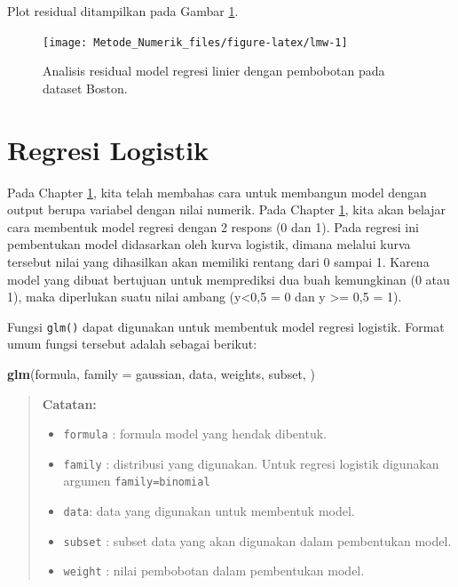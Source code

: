 \documentclass[
]{book}
\newenvironment{Shaded}{\begin{snugshade}}{\end{snugshade}}
\newcommand{\AttributeTok}[1]{\textcolor[rgb]{0.13,0.29,0.53}{#1}}
\newcommand{\FunctionTok}[1]{\textcolor[rgb]{0.13,0.29,0.53}{\textbf{#1}}}
\newcommand{\NormalTok}[1]{#1}
\providecommand{\tightlist}{%
  \setlength{\itemsep}{0pt}\setlength{\parskip}{0pt}}
\theoremstyle{definition}
\theoremstyle{definition}
\theoremstyle{definition}
\theoremstyle{definition}
\theoremstyle{remark}
\begin{document}
Plot residual ditampilkan pada Gambar \ref{fig:lmw}.

\begin{figure}

{\centering \texttt{[image: Metode\_Numerik\_files/figure-latex/lmw-1]} 

}

\caption{Analisis residual model regresi linier dengan pembobotan pada dataset Boston.}\label{fig:lmw}
\end{figure}

\hypertarget{logreg}{%
\section{Regresi Logistik}\label{logreg}}

Pada Chapter \ref{logreg}, kita telah membahas cara untuk membangun model dengan output berupa variabel dengan nilai numerik. Pada Chapter \ref{logreg}, kita akan belajar cara membentuk model regresi dengan 2 respons (0 dan 1). Pada regresi ini pembentukan model didasarkan oleh kurva logistik, dimana melalui kurva tersebut nilai yang dihasilkan akan memiliki rentang dari 0 sampai 1. Karena model yang dibuat bertujuan untuk memprediksi dua buah kemungkinan (0 atau 1), maka diperlukan suatu nilai ambang (y\textless0,5 = 0 dan y \textgreater= 0,5 = 1).

Fungsi \texttt{glm()} dapat digunakan untuk membentuk model regresi logistik. Format umum fungsi tersebut adalah sebagai berikut:

\begin{Shaded}
\begin{Highlighting}[]
\FunctionTok{glm}\NormalTok{(formula, }\AttributeTok{family =}\NormalTok{ gaussian, data, weights, subset,}
\NormalTok{    )}
\end{Highlighting}
\end{Shaded}

\begin{quote}
\textbf{Catatan:}

\begin{itemize}
\tightlist
\item
  \texttt{formula} : formula model yang hendak dibentuk.
\item
  \texttt{family} : distribusi yang digunakan. Untuk regresi logistik digunakan argumen \texttt{family=binomial}
\item
  \texttt{data}: data yang digunakan untuk membentuk model.
\item
  \texttt{subset} : subset data yang akan digunakan dalam pembentukan model.
\item
  \texttt{weight} : nilai pembobotan dalam pembentukan model.
\end{itemize}
\end{quote}
\end{document}
